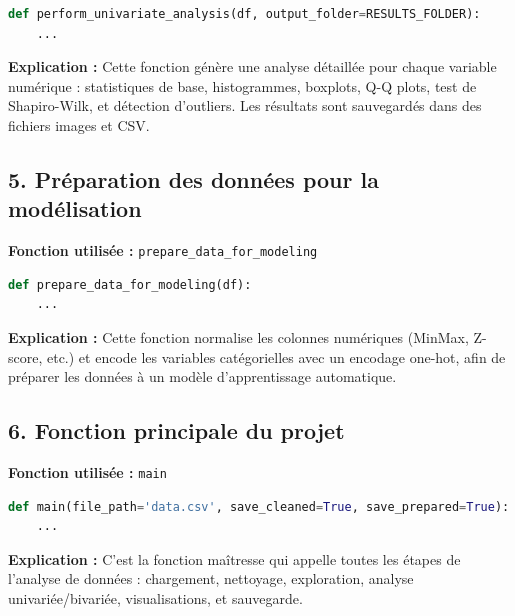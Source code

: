 \documentclass[12pt]{report}
\begin{document}
\begin{lstlisting}[language=Python, caption=Statistiques, histogrammes, tests de normalité]
def perform_univariate_analysis(df, output_folder=RESULTS_FOLDER):
    ...
\end{lstlisting}

\textbf{Explication :} Cette fonction génère une analyse détaillée pour chaque variable numérique : statistiques de base, histogrammes, boxplots, Q-Q plots, test de Shapiro-Wilk, et détection d’outliers. Les résultats sont sauvegardés dans des fichiers images et CSV.

\subsection*{5. Préparation des données pour la modélisation}
\textbf{Fonction utilisée :} \texttt{prepare\_data\_for\_modeling}

\begin{lstlisting}[language=Python, caption=Encodage et normalisation des données]
def prepare_data_for_modeling(df):
    ...
\end{lstlisting}

\textbf{Explication :} Cette fonction normalise les colonnes numériques (MinMax, Z-score, etc.) et encode les variables catégorielles avec un encodage one-hot, afin de préparer les données à un modèle d’apprentissage automatique.

\subsection*{6. Fonction principale du projet}
\textbf{Fonction utilisée :} \texttt{main}

\begin{lstlisting}[language=Python, caption=Pipeline complet de traitement des données]
def main(file_path='data.csv', save_cleaned=True, save_prepared=True):
    ...
\end{lstlisting}

\textbf{Explication :} C’est la fonction maîtresse qui appelle toutes les étapes de l’analyse de données : chargement, nettoyage, exploration, analyse univariée/bivariée, visualisations, et sauvegarde.
\end{document}
